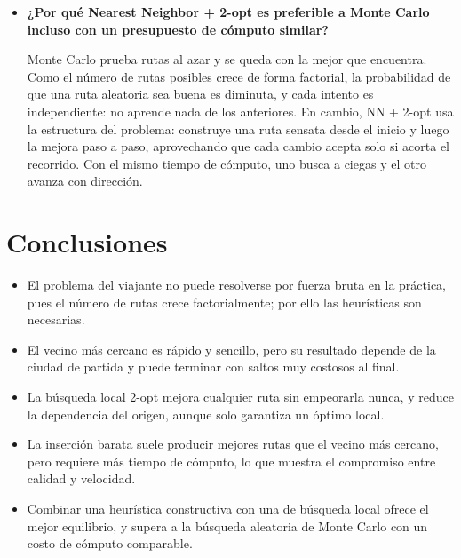 \documentclass{article}
\begin{document}
\begin{itemize}
    \item \textbf{¿Por qué Nearest Neighbor + 2-opt es preferible a Monte Carlo incluso con un presupuesto de cómputo similar?}

    Monte Carlo prueba rutas al azar y se queda con la mejor que encuentra. Como el número de rutas posibles crece de forma factorial, la probabilidad de que una ruta aleatoria sea buena es diminuta, y cada intento es independiente: no aprende nada de los anteriores. En cambio, NN + 2-opt usa la estructura del problema: construye una ruta sensata desde el inicio y luego la mejora paso a paso, aprovechando que cada cambio acepta solo si acorta el recorrido. Con el mismo tiempo de cómputo, uno busca a ciegas y el otro avanza con dirección. 
\end{itemize}

\section{Conclusiones}

\begin{itemize}
    \item El problema del viajante no puede resolverse por fuerza bruta en la práctica, pues el número de rutas crece factorialmente; por ello las heurísticas son necesarias.
    \item El vecino más cercano es rápido y sencillo, pero su resultado depende de la ciudad de partida y puede terminar con saltos muy costosos al final.
    \item La búsqueda local 2-opt mejora cualquier ruta sin empeorarla nunca, y reduce la dependencia del origen, aunque solo garantiza un óptimo local.
    \item La inserción barata suele producir mejores rutas que el vecino más cercano, pero requiere más tiempo de cómputo, lo que muestra el compromiso entre calidad y velocidad.
    \item Combinar una heurística constructiva con una de búsqueda local ofrece el mejor equilibrio, y supera a la búsqueda aleatoria de Monte Carlo con un costo de cómputo comparable.
\end{itemize}

	
	
    
%
%
%
			
\end{document}
